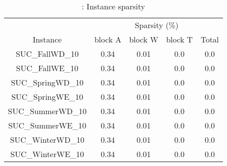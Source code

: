 \begin{table}[H]
\centering
\caption{\suc: Instance sparsity} 
\label{table:instance_sparsity_info_suc} 
\begin{tabular}{|c|cccc|}
\hline 
& \multicolumn{4}{c|}{Sparsity (\%)}  \\ \cline{2-5}
Instance      & block A & block W & block T & Total \\ \hline
SUC\_FallWD\_10 & 0.34 & 0.01 & 0.0 & 0.0 \\ 
SUC\_FallWE\_10 & 0.34 & 0.01 & 0.0 & 0.0 \\ 
SUC\_SpringWD\_10 & 0.34 & 0.01 & 0.0 & 0.0 \\ 
SUC\_SpringWE\_10 & 0.34 & 0.01 & 0.0 & 0.0 \\ 
SUC\_SummerWD\_10 & 0.34 & 0.01 & 0.0 & 0.0 \\ 
SUC\_SummerWE\_10 & 0.34 & 0.01 & 0.0 & 0.0 \\ 
SUC\_WinterWD\_10 & 0.34 & 0.01 & 0.0 & 0.0 \\ 
SUC\_WinterWE\_10 & 0.34 & 0.01 & 0.0 & 0.0 \\ 
\hline 
\end{tabular} 
\end{table} 
  

